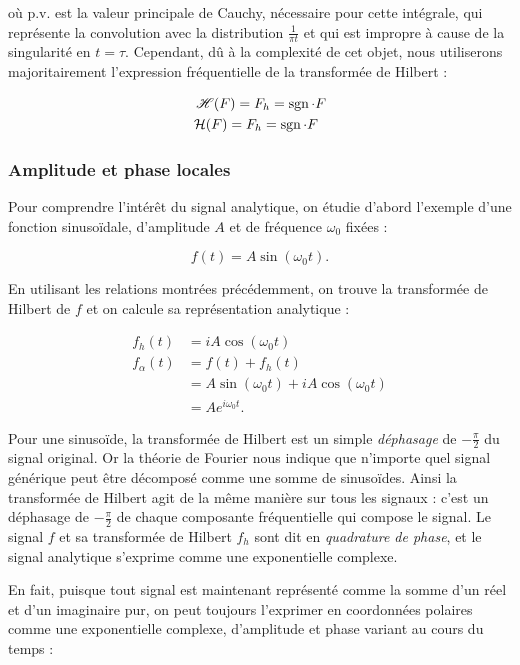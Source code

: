 où p.v. est la valeur principale de Cauchy, nécessaire pour cette intégrale, qui représente la convolution avec la distribution $\frac 1{\pi t}$ et qui est impropre à cause de la singularité en $t=\tau$. Cependant, dû à la complexité de cet objet, nous utiliserons majoritairement l'expression fréquentielle de la transformée de Hilbert :

\begin{align*}
    &\operatorname{\mathscr{H}}(F) = F_h = \operatorname{sgn}\cdot F \\
    &\mathcal{H}(F) = F_h = \operatorname{sgn}\cdot F
\end{align*}


\subsubsection{Amplitude et phase locales}

Pour comprendre l'intérêt du signal analytique, on étudie d'abord l'exemple d'une fonction sinusoïdale, d'amplitude $A$ et de fréquence $\omega_0$ fixées :

\begin{equation}
    f(t) = A\sin(\omega_0t).
\end{equation}

En utilisant les relations montrées précédemment, on trouve la transformée de Hilbert de $f$ et on calcule sa représentation analytique :

\begin{align}
    f_h(t) &= iA\cos(\omega_0t) \\
    f_{\alpha}(t) &= f(t) + f_h(t) \\
    &= A\sin(\omega_0t)+iA\cos(\omega_0t) \\
    &= Ae^{i\omega_0t}.
\end{align}

Pour une sinusoïde, la transformée de Hilbert est un simple \textit{déphasage} de $-\frac{\pi}2$ du signal original. Or la théorie de Fourier nous indique que n'importe quel signal générique peut être décomposé comme une somme de sinusoïdes. Ainsi la transformée de Hilbert agit de la même manière sur tous les signaux : c'est un déphasage de $-\frac{\pi}2$ de chaque composante fréquentielle qui compose le signal. Le signal $f$ et sa transformée de Hilbert $f_h$ sont dit en \textit{quadrature de phase}, et le signal analytique s'exprime comme une exponentielle complexe.

\bigskip

En fait, puisque tout signal est maintenant représenté comme la somme d'un réel et d'un imaginaire pur, on peut toujours l'exprimer en coordonnées polaires comme une exponentielle complexe, d'amplitude et phase variant au cours du temps :

